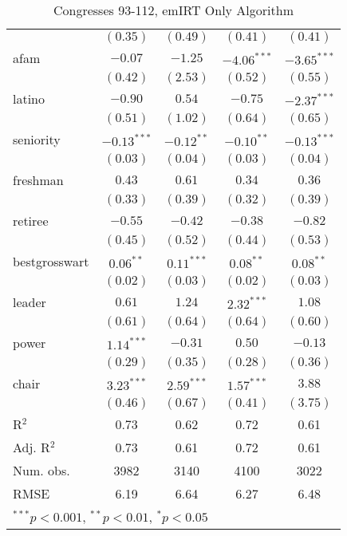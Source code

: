 \documentclass[12pt]{article}
\begin{document}
\begin{table}
\begin{center}
\begin{tabular}{l c c c c }
			& $(0.35)$      & $(0.49)$     & $(0.41)$      & $(0.41)$      \\
			afam                   & $-0.07$       & $-1.25$      & $-4.06^{***}$ & $-3.65^{***}$ \\
			& $(0.42)$      & $(2.53)$     & $(0.52)$      & $(0.55)$      \\
			latino                 & $-0.90$       & $0.54$       & $-0.75$       & $-2.37^{***}$ \\
			& $(0.51)$      & $(1.02)$     & $(0.64)$      & $(0.65)$      \\
			seniority              & $-0.13^{***}$ & $-0.12^{**}$ & $-0.10^{**}$  & $-0.13^{***}$ \\
			& $(0.03)$      & $(0.04)$     & $(0.03)$      & $(0.04)$      \\
			freshman               & $0.43$        & $0.61$       & $0.34$        & $0.36$        \\
			& $(0.33)$      & $(0.39)$     & $(0.32)$      & $(0.39)$      \\
			retiree                & $-0.55$       & $-0.42$      & $-0.38$       & $-0.82$       \\
			& $(0.45)$      & $(0.52)$     & $(0.44)$      & $(0.53)$      \\
			bestgrosswart          & $0.06^{**}$   & $0.11^{***}$ & $0.08^{**}$   & $0.08^{**}$   \\
			& $(0.02)$      & $(0.03)$     & $(0.02)$      & $(0.03)$      \\
			leader                 & $0.61$        & $1.24$       & $2.32^{***}$  & $1.08$        \\
			& $(0.61)$      & $(0.64)$     & $(0.64)$      & $(0.60)$      \\
			power                  & $1.14^{***}$  & $-0.31$      & $0.50$        & $-0.13$       \\
			& $(0.29)$      & $(0.35)$     & $(0.28)$      & $(0.36)$      \\
			chair                  & $3.23^{***}$  & $2.59^{***}$ & $1.57^{***}$  & $3.88$        \\
			& $(0.46)$      & $(0.67)$     & $(0.41)$      & $(3.75)$      \\
			\hline
			R$^2$                  & 0.73          & 0.62         & 0.72          & 0.61          \\
			Adj. R$^2$             & 0.73          & 0.61         & 0.72          & 0.61          \\
			Num. obs.              & 3982          & 3140         & 4100          & 3022          \\
			RMSE                   & 6.19          & 6.64         & 6.27          & 6.48          \\
			\hline
			\multicolumn{5}{l}{\scriptsize{$^{***}p<0.001$, $^{**}p<0.01$, $^*p<0.05$}}
		\end{tabular}
		\caption{Congresses 93-112, emIRT Only Algorithm}
	\end{center}
\end{table}
\end{document}
